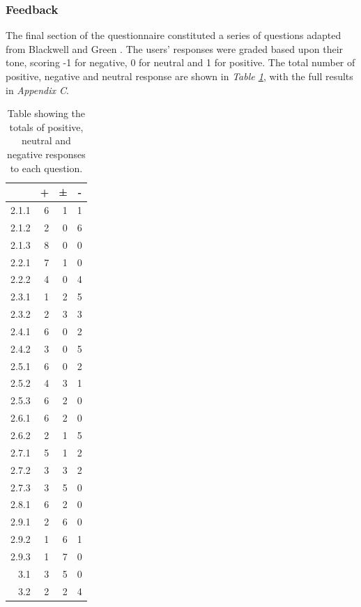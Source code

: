 \documentclass[12pt,twoside,notitlepage,xetex]{report}
\begin{document}
\subsubsection{Feedback}

The final section of the questionnaire constituted a series of questions adapted from Blackwell and Green \cite{Blackwell2000}.  The users' responses were graded based upon their tone, scoring -1 for negative, 0 for neutral and 1 for positive.  The total number of positive, negative and neutral response are shown in \emph{Table \ref{tab:FeedbackScores}}, with the full results in \emph{Appendix C}.

\begin{center}
\begin{table}[H]
\begin{center}
\begin{tabular}{|r||r|r|r|}
\cline{2-4}
\multicolumn{1}{c|}{} & \multicolumn{1}{c|}{+} & \multicolumn{1}{c|}{±} & \multicolumn{1}{c|}{-}\\ \hline \hline
2.1.1 & 6 & 1 & 1\\ \hline
2.1.2 & 2 & 0 & 6\\ \hline
2.1.3 & 8 & 0 & 0\\ \hline
2.2.1 & 7 & 1 & 0\\ \hline
2.2.2 & 4 & 0 & 4\\ \hline
2.3.1 & 1 & 2 & 5\\ \hline
2.3.2 & 2 & 3 & 3\\ \hline
2.4.1 & 6 & 0 & 2\\ \hline
2.4.2 & 3 & 0 & 5\\ \hline
2.5.1 & 6 & 0 & 2\\ \hline
2.5.2 & 4 & 3 & 1\\ \hline
2.5.3 & 6 & 2 & 0\\ \hline
2.6.1 & 6 & 2 & 0\\ \hline
2.6.2 & 2 & 1 & 5\\ \hline
2.7.1 & 5 & 1 & 2\\ \hline
2.7.2 & 3 & 3 & 2\\ \hline
2.7.3 & 3 & 5 & 0\\ \hline
2.8.1 & 6 & 2 & 0\\ \hline
2.9.1 & 2 & 6 & 0\\ \hline
2.9.2 & 1 & 6 & 1\\ \hline
2.9.3 & 1 & 7 & 0\\ \hline
3.1 & 3 & 5 & 0\\ \hline
3.2 & 2 & 2 & 4\\
\hline
\end{tabular}
\end{center}
\caption{Table showing the totals of positive, neutral and negative responses to each question.}
\label{tab:FeedbackScores}
\end{table}
\end{center}
\end{document}
